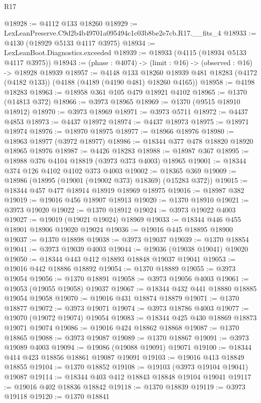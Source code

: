 \begin{lexlean}{R17}
\begin{coremodule}
@18928 := @4112 @133 @18260
@18929 := LexLeanPreserve.C9d2b4b49701a095494c1c03b8be2e7cb.R17.__fits_4
@18933 := @4130 (@18929 @5133 @4117 @3975)
@18934 := LexLeanBoot.Diagnostics.exceeded
@18939 := @18933 (@4115 (@18934 @5133 @4117 @3975))
@18943 := (phase : @4074) -> (limit : @16) -> (observed : @16) -> @18928 @18939
@18957 := @4148
    @133
    @18260
    @18939
    @481
    @18283
    (@4172 (@4182 @133))
    (@4188 (@4189 (@4190 @481) @18260 @4165))
@18958 := @4198 @18283
@18963 := @18958 @361 @105 @479 @18921 @4102
@18965 := @1370 (@14813 @372)
@18966 := @3973 @18965
@18969 := @1370 (@9515 @18910 @18912)
@18970 := @3973 @18969
@18971 := @3973 @5711
@18972 := @4437 @4853
@18973 := @4437 @18972
@18974 := @4437 @18973
@18975 := @18971 @18974
@18976 := @18970 @18975
@18977 := @18966 @18976
@18980 := @18963 @18977 (@3972 @18977)
@18986 := @18344 @377 @478 @18820 @18920 @18965 @18976
@18987 := @4426 @18283
@18988 := @18987 @367
@18995 := @18988 @376 @4104 @18819 (@3973 @373 @4003) @18965
@19001 := @18344 @374 @126 @4102 @4102 @373 @4003
@19002 := @18365 @369
@19009 := @18986 (@18995 (@19001 (@19002 @373) @18369) (@15283 @372))
@19015 := @18344 @457 @477 @18914 @18919 @18969 @18975
@19016 := @18987 @382
@19019 := @19016 @456 @18907 @18913
@19020 := @1370 @18910
@19021 := @3973 @19020
@19022 := @1370 @18912
@19024 := @3973 @19022 @4003
@19027 := @19019 (@19021 @19024) @18969
@19033 := @18344 @446 @455 @18901 @18906 @19020 @19024
@19036 := @19016 @445 @18895 @18900
@19037 := @1370 @18898
@19038 := @3973 @19037
@19039 := @1370 @18854
@19041 := @3973 @19039 @4003
@19044 := @19036 (@19038 @19041) @19020
@19050 := @18344 @443 @412 @18893 @18848 @19037 @19041
@19053 := @19016 @442 @18886 @18892
@19054 := @1370 @18889
@19055 := @3973 @19054
@19056 := @1370 @18891
@19058 := @3973 @19056 @4003
@19061 := @19053 (@19055 @19058) @19037
@19067 := @18344 @432 @441 @18880 @18885 @19054 @19058
@19070 := @19016 @431 @18874 @18879
@19071 := @1370 @18877
@19072 := @3973 @19071
@19074 := @3973 @18786 @4003
@19077 := @19070 (@19072 @19074) @19054
@19083 := @18344 @425 @430 @18869 @18873 @19071 @19074
@19086 := @19016 @424 @18862 @18868
@19087 := @1370 @18865
@19088 := @3973 @19087
@19089 := @1370 @18867
@19091 := @3973 @19089 @4003
@19094 := @19086 (@19088 @19091) @19071
@19100 := @18344 @414 @423 @18856 @18861 @19087 @19091
@19103 := @19016 @413 @18849 @18855
@19104 := @1370 @18852
@19108 := @19103 (@3973 @19104 @19041) @19087
@19114 := @18344 @403 @412 @18843 @18848 @19104 @19041
@19117 := @19016 @402 @18836 @18842
@19118 := @1370 @18839
@19119 := @3973 @19118
@19120 := @1370 @18841

\end{coremodule}
\end{lexlean}
